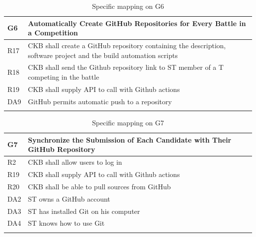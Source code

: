   \begin{longtable}{|l|p{12cm}|}
    \hline
    \textbf{G6} & \textbf{Automatically Create GitHub Repositories for Every Battle in a Competition}      \\
    \hline
    R17 & CKB shall create a GitHub repository containing the description, software project and the build automation scripts \\
    \hline
    R18 & CKB shall send the Github repository link to ST member of a T competing in the battle \\
    \hline
    R19 & CKB shall supply API to call with Github actions \\
    \hline
    DA9 & GitHub permits automatic push to a repository \\
    \hline

    \caption{Specific mapping on G6}
    \label{tab:mappingG6}
  \end{longtable}
  
  \begin{longtable}{|l|p{12cm}|}
    \hline
    \textbf{G7} & \textbf{Synchronize the Submission of Each Candidate with Their GitHub Repository}      \\
    \hline
    R2 & CKB shall allow users to log in \\
    \hline
    R19 & CKB shall supply API to call with Github actions \\
    \hline
    R20 & CKB shall be able to pull sources from GitHub \\
    \hline
    DA2 & ST owns a GitHub account \\
    \hline
    DA3 & ST has installed Git on his computer \\
    \hline
    DA4 & ST knows how to use Git \\
    \hline

    \caption{Specific mapping on G7}
    \label{tab:mappingG7}
  \end{longtable}



